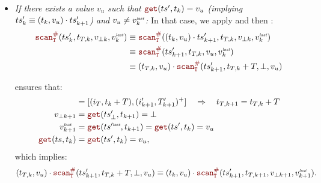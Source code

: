 \begin{skippableproof}
\begin{itemize}
\begin{itemize}
                  \item \textit{If there exists a value $v_u$ such that $\getAt{\ts'}{t_k} = v_u$
                        (implying $ts'_k \equiv (t_k, v_u) \cdot ts'_{k+1}$) and $v_u \neq v^{\textit{\tiny last}}_k$:}
                        In that case, we apply  and
                        then :
                        \begin{align*}
                            \scanAux{\ts'_k}{T}{t_{T, k}}{v_{\bot k}}{v^\explast_k} & \equiv
                            \scanAux{(t_k, v_u) \next \ts'_{k+1}}{T}{t_{T, k}}{v_{\bot k}}{v^\explast_k} \\
                                                                                    & \equiv
                            \scanAux{\ts'_{k+1}}{T}{t_{T, k}}{v_u}{v^\explast_k}                         \\
                                                                                    & \equiv
                            (t_{T, k}, v_u) \next \scanAux{\ts'_{k+1}}{T}{t_{T, k} + T}{\bot}{v_u}
                        \end{align*}

                         ensures that:
                        \begin{align*}
                            [(i_{k+1}, T_{k+1})^+] & = [(i_T, t_k + T), (i'_{k+1}, T'_{k+1})^+]
                            \quad \Rightarrow \quad t_{T, k+1} = t_{T, k} + T                                          \\
                            v_{\bot k+1}           & = \getAt{\ts'_\bot}{t_{k+1}} = \bot                               \\
                            v^\explast_{k+1}       & = \getAt{\ts^{\prime\explast}}{t_{k+1}} = \getAt{\ts'}{t_k} = v_u \\
                            \getAt{\ts}{t_k}       & = \getAt{\ts'}{t_k} = v_u,
                        \end{align*}
                        which implies:
                        \begin{equation*}
                            (t_{T, k}, v_u) \next \scanAux{\ts'_{k+1}}{T}{t_{T, k} + T}{\bot}{v_u} \equiv
                            (t_k, v_u) \next \scanAux{\ts'_{k+1}}{T}{t_{T, k+1}}{v_{\bot k+1}}{v^\explast_{k+1}}.
                        \end{equation*}


\end{itemize}
\end{itemize}
\end{skippableproof}
